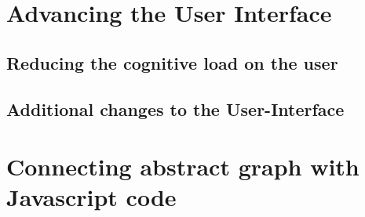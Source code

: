 \section{Advancing the User Interface}

	\subsection{Reducing the cognitive load on the user}
	
	\subsection{Additional changes to the User-Interface}
	
\section{Connecting abstract graph with Javascript code}
	
